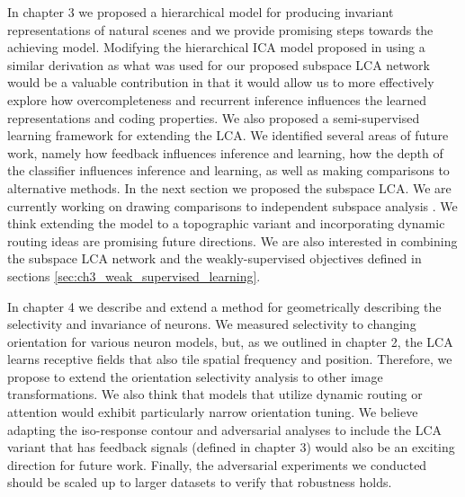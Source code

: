 In chapter 3 we proposed a hierarchical model for producing invariant representations of natural scenes and we provide promising steps towards the achieving model. %
Modifying the hierarchical ICA model proposed in \parencite{karklin2003learning} using a similar derivation as what was used for our proposed subspace LCA network would be a valuable contribution in that it would allow us to more effectively explore how overcompleteness and recurrent inference influences the learned representations and coding properties.
We also proposed a semi-supervised learning framework for extending the LCA.
We identified several areas of future work, namely how feedback influences inference and learning, how the depth of the classifier influences inference and learning, as well as making comparisons to alternative methods.
In the next section we proposed the subspace LCA.
We are currently working on drawing comparisons to independent subspace analysis \parencite{hyvarinen2000emergence}.
We think extending the model to a topographic variant and incorporating dynamic routing ideas \parencite{olshausen1993neurobiological} are promising future directions.
We are also interested in combining the subspace LCA network and the weakly-supervised objectives defined in sections \ref{sec:ch3_weak_supervised_learning}.

In chapter 4 we describe and extend a method for geometrically describing the selectivity and invariance of neurons. %
We measured selectivity to changing orientation for various neuron models, but, as we outlined in chapter 2, the LCA learns receptive fields that also tile spatial frequency and position. %
Therefore, we propose to extend the orientation selectivity analysis to other image transformations.
We also think that models that utilize dynamic routing or attention would exhibit particularly narrow orientation tuning.
We believe adapting the iso-response contour and adversarial analyses to include the LCA variant that has feedback signals (defined in chapter 3) would also be an exciting direction for future work. %
Finally, the adversarial experiments we conducted should be scaled up to larger datasets to verify that robustness holds.